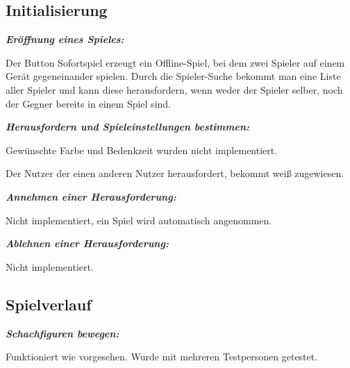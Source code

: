 \documentclass[parskip=full]{scrartcl}
\begin{document}
\begin{description}
	
	\subsection{Initialisierung}
	\item[T2010] \textbf{\textit{Eröffnung eines Spieles: }} 
	\begin{description}
	\item Der Button Sofortspiel erzeugt ein Offline-Spiel, bei dem zwei Spieler auf einem Gerät gegeneinander spielen. Durch die Spieler-Suche bekommt man eine Liste aller Spieler und kann diese herausfordern, wenn weder der Spieler selber, noch der Gegner bereits in einem Spiel sind.
	\end{description}
	

	
	\item[T2020] \textbf{\textit{Herausfordern und Spieleinstellungen bestimmen: }} 
	\begin{description}
	\item Gewünschte Farbe und Bedenkzeit wurden nicht implementiert.
	\item Der Nutzer der einen anderen Nutzer herausfordert, bekommt weiß zugewiesen.
	\end{description}
	

	
	\item[T2030] \textbf{\textit{Annehmen einer Herausforderung: }} 
	\begin{description}
	\item Nicht implementiert, ein Spiel wird automatisch angenommen.
	\end{description}

	
	\item[T2040] \textbf{\textit{Ablehnen einer Herausforderung: }} 
	\begin{description}
	\item Nicht implementiert.
	\end{description}

	
	\subsection{Spielverlauf}
	
	\item[T3010] \textbf{\textit{Schachfiguren bewegen: }} 
	\begin{description}
	\item Funktioniert wie vorgesehen. Wurde mit mehreren Testpersonen getestet.
	\end{description}
			

\end{description}
\end{document}
